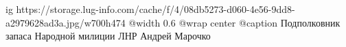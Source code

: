  
 
 
 
 

\ifcmt
  ig https://storage.lug-info.com/cache/f/4/08db5273-d060-4e56-9dd8-a2979628ad3a.jpg/w700h474%
  @width 0.6
	@wrap center
	@caption Подполковник запаса Народной милиции ЛНР Андрей Марочко
\fi
